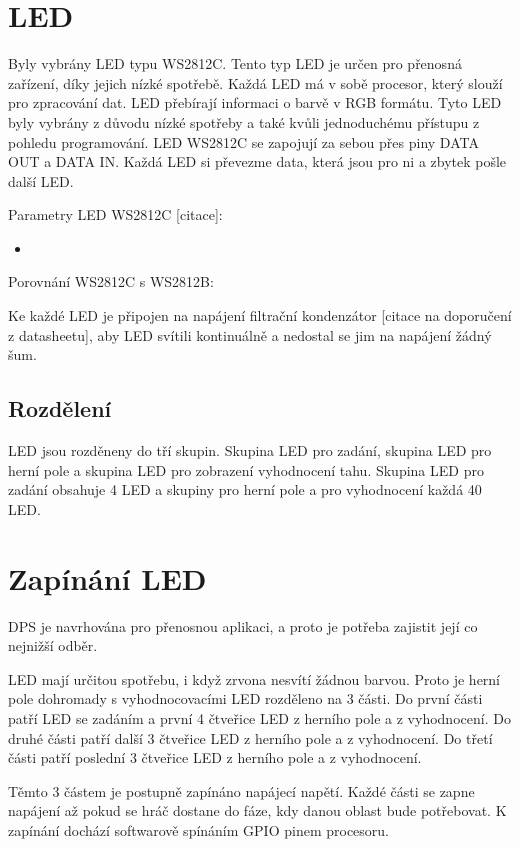 \section{LED}
Byly vybrány LED typu WS2812C. Tento typ LED je určen pro přenosná zařízení, díky jejich nízké spotřebě. Každá LED 
má v sobě procesor, který slouží pro zpracování dat. LED přebírají informaci o barvě v RGB formátu. 
Tyto LED byly vybrány z důvodu nízké spotřeby a také kvůli jednoduchému přístupu z pohledu programování.
LED WS2812C se zapojují za sebou přes piny DATA OUT a DATA IN. Každá LED si převezme data, která jsou pro ni a zbytek pošle 
další LED.

Parametry LED WS2812C [citace]: %
\begin{itemize}
    \item 
\end{itemize}

Porovnání WS2812C s WS2812B:

Ke každé LED je připojen na napájení filtrační kondenzátor [citace na doporučení z datasheetu], aby LED svítili kontinuálně 
a nedostal se jim na napájení žádný šum.

\subsection{Rozdělení}
LED jsou rozděneny do tří skupin. Skupina LED pro zadání, skupina LED pro herní pole a skupina LED pro zobrazení vyhodnocení 
tahu.
Skupina LED pro zadání obsahuje 4 LED a skupiny pro herní pole a pro vyhodnocení každá 40 LED.

\section{Zapínání LED}
DPS je navrhována pro přenosnou aplikaci, a proto je potřeba zajistit její co nejnižší odběr. 

LED mají určitou spotřebu, i když zrvona nesvítí žádnou barvou. Proto je herní pole dohromady s vyhodnocovacími LED rozděleno 
na 3 části. Do první části patří LED se zadáním a první 4 čtveřice LED z herního pole a z vyhodnocení. Do druhé části patří 
další 3 čtveřice LED z herního pole a z vyhodnocení. Do třetí části patří poslední 3 čtveřice LED z herního pole a z 
vyhodnocení.

Těmto 3 částem je postupně zapínáno napájecí napětí. Každé části se zapne napájení až pokud se hráč dostane do fáze, kdy 
danou oblast bude potřebovat. K zapínání dochází softwarově spínáním GPIO pinem procesoru.

